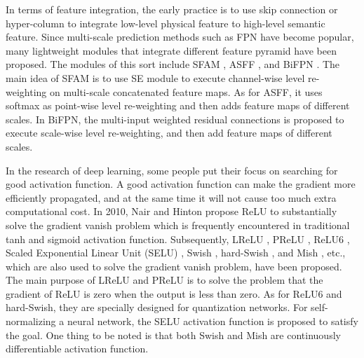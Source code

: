 \documentclass[10pt,twocolumn,letterpaper]{article}
\begin{document}
In terms of feature integration, the early practice is to use skip connection \cite{long2015fully} or hyper-column \cite{hariharan2015hypercolumns} to integrate low-level physical feature to high-level semantic feature. Since multi-scale prediction methods such as FPN have become popular, many lightweight modules that integrate different feature pyramid have been proposed. The modules of this sort include SFAM \cite{zhao2019m2det}, ASFF \cite{liu2019learning}, and BiFPN \cite{tan2019efficientdet}. The main idea of SFAM is to use SE module to execute channel-wise level re-weighting on multi-scale concatenated feature maps. As for ASFF, it uses softmax as point-wise level re-weighting and then adds feature maps of different scales. In BiFPN, the multi-input weighted residual connections is proposed to execute scale-wise level re-weighting, and then add feature maps of different scales.

In the research of deep learning, some people put their focus on searching for good activation function. A good activation function can make the gradient more efficiently propagated, and at the same time it will not cause too much extra computational cost. In 2010, Nair and Hinton \cite{nair2010rectified} propose ReLU to substantially solve the gradient vanish problem which is frequently encountered in traditional tanh and sigmoid activation function. Subsequently, LReLU \cite{maas2013rectifier}, PReLU \cite{he2015delving}, ReLU6 \cite{howard2017mobilenets}, Scaled Exponential Linear Unit (SELU) \cite{klambauer2017self}, Swish \cite{ramachandran2017searching}, hard-Swish \cite{howard2019searching}, and Mish \cite{misra2019mish}, etc., which are also used to solve the gradient vanish problem, have been proposed. The main purpose of LReLU and PReLU is to solve the problem that the gradient of ReLU is zero when the output is less than zero. As for ReLU6 and hard-Swish, they are specially designed for quantization networks. For self-normalizing a neural network, the SELU activation function is proposed to satisfy the goal. One thing to be noted is that both Swish and Mish are continuously differentiable activation function.
\end{document}
